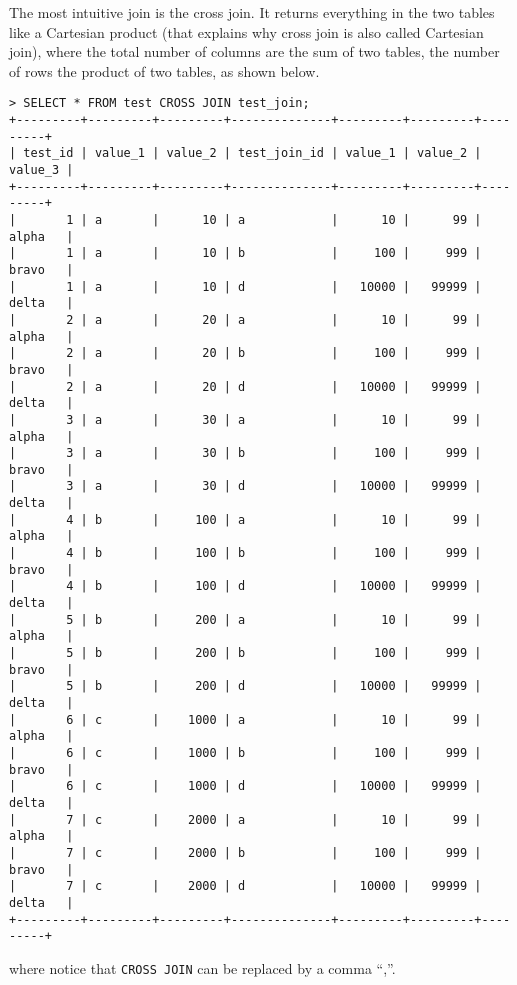 The most intuitive join is the cross join. It returns everything in the two tables like a Cartesian product (that explains why cross join is also called Cartesian join), where the total number of columns are the sum of two tables, the number of rows the product of two tables, as shown below.
\begin{lstlisting}
> SELECT * FROM test CROSS JOIN test_join;
+---------+---------+---------+--------------+---------+---------+---------+
| test_id | value_1 | value_2 | test_join_id | value_1 | value_2 | value_3 |
+---------+---------+---------+--------------+---------+---------+---------+
|       1 | a       |      10 | a            |      10 |      99 | alpha   |
|       1 | a       |      10 | b            |     100 |     999 | bravo   |
|       1 | a       |      10 | d            |   10000 |   99999 | delta   |
|       2 | a       |      20 | a            |      10 |      99 | alpha   |
|       2 | a       |      20 | b            |     100 |     999 | bravo   |
|       2 | a       |      20 | d            |   10000 |   99999 | delta   |
|       3 | a       |      30 | a            |      10 |      99 | alpha   |
|       3 | a       |      30 | b            |     100 |     999 | bravo   |
|       3 | a       |      30 | d            |   10000 |   99999 | delta   |
|       4 | b       |     100 | a            |      10 |      99 | alpha   |
|       4 | b       |     100 | b            |     100 |     999 | bravo   |
|       4 | b       |     100 | d            |   10000 |   99999 | delta   |
|       5 | b       |     200 | a            |      10 |      99 | alpha   |
|       5 | b       |     200 | b            |     100 |     999 | bravo   |
|       5 | b       |     200 | d            |   10000 |   99999 | delta   |
|       6 | c       |    1000 | a            |      10 |      99 | alpha   |
|       6 | c       |    1000 | b            |     100 |     999 | bravo   |
|       6 | c       |    1000 | d            |   10000 |   99999 | delta   |
|       7 | c       |    2000 | a            |      10 |      99 | alpha   |
|       7 | c       |    2000 | b            |     100 |     999 | bravo   |
|       7 | c       |    2000 | d            |   10000 |   99999 | delta   |
+---------+---------+---------+--------------+---------+---------+---------+
\end{lstlisting}
where notice that \verb|CROSS JOIN| can be replaced by a comma ``,''.

